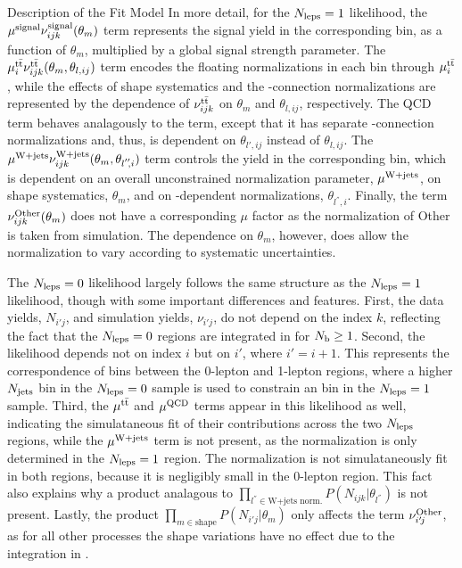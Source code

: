 \begin{section}{Description of the Fit Model}
In more detail, for the $N_{\mathrm{leps}} = 1$ likelihood, the $\mu^{\text{signal}}\nu^{\text{signal}}_{ijk}(\theta_m)$ term represents the signal yield in the corresponding bin, as a function of $\theta_m$, multiplied by a global signal strength parameter.
The $\mu^{\mathrm{t\bar{t}}}_{i}\nu^{\mathrm{t\bar{t}}}_{ijk}(\theta_m, \theta_{l,ij})$ term encodes the floating normalizations in each \Njets bin through $\mu^{\mathrm{t\bar{t}}}_{i}$, while the effects of shape systematics and the \MJ-connection normalizations are represented by the dependence of $\nu^{\mathrm{t\bar{t}}}_{ijk}$ on $\theta_m$ and $\theta_{l,ij}$, respectively.
The QCD term behaves analagously to the \ttbar term, except that it has separate \MJ-connection normalizations and, thus, is dependent on $\theta_{l'\!,ij}$ instead of $\theta_{l,ij}$.
The $\mu^{\mathrm{W+jets}}\nu^{\mathrm{W+jets}}_{ijk}(\theta_m, \theta_{l^{''}\!\!,i})$ term controls the \Wjets yield in the corresponding bin, which is dependent on an overall unconstrained normalization parameter, $\mu^{\mathrm{W+jets}}$, on shape systematics, $\theta_m$, and on \Njets-dependent normalizations, $\theta_{l^{''}\!\!,i}$.
Finally, the term $\nu^{\text{Other}}_{ijk}(\theta_m)$ does not have a corresponding $\mu$ factor as the normalization of Other is taken from simulation.
The dependence on $\theta_m$, however, does allow the normalization to vary according to systematic uncertainties.

The $N_{\mathrm{leps}} = 0$ likelihood largely follows the same structure as the $N_{\mathrm{leps}} = 1$ likelihood, though with some important differences and features.
First, the data yields, $N_{i'\!j}$, and simulation yields, $\nu_{i'\!j}$, do not depend on the index $k$, reflecting the fact that the $N_{\mathrm{leps}} = 0$ regions are integrated in \Nb for $N_{\mathrm{b}} \geq 1$.
Second, the likelihood depends not on index $i$ but on $i'$, where $i' = i + 1$. This represents the correspondence of \Njets bins between the 0-lepton and 1-lepton regions, where a higher $N_{\mathrm{jets}}$ bin in the $N_{\mathrm{leps}} = 0$ sample is used to constrain an \Njets bin in the $N_{\mathrm{leps}} = 1$ sample.
Third, the $\mu^{\mathrm{t\bar{t}}}$ and $\mu^{\text{QCD}}$ terms appear in this likelihood as well, indicating the simulataneous fit of their contributions across the two $N_{\mathrm{leps}}$ regions, while the $\mu^{\mathrm{W+jets}}$ term is not present, as the \Wjets normalization is only determined in the $N_{\mathrm{leps}} = 1$ region.
The \Wjets normalization is not simulataneously fit in both \Nleps regions, because it is negligibly small in the 0-lepton region.
This fact also explains why a product analagous to $\displaystyle \prod_{l^{''}\!\in\text{W+jets norm.}} P(N_{ijk}|\theta_{l^{''}})$ is not present.
Lastly, the product $\displaystyle \prod_{m\in\text{shape}} P(N_{i'\!j}|\theta_{m})$ only affects the term $\nu^{\text{Other}}_{i'\!j}$, as for all other processes the shape variations have no effect due to the integration in \Nb.

\end{section}


